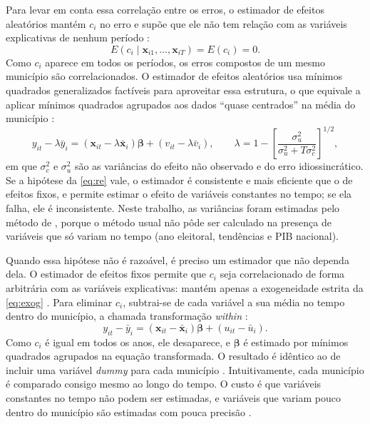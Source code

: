 Para levar em conta essa correlação entre os erros, o estimador de efeitos aleatórios mantém $c_i$ no erro e supõe que ele não tem relação com as variáveis explicativas de nenhum período \parencite[p.~257]{wooldridge2002}:
\begin{equation}\label{eq:re}
E(c_i \mid \mathbf{x}_{i1}, \dots, \mathbf{x}_{iT}) = E(c_i) = 0.
\end{equation}
Como $c_i$ aparece em todos os períodos, os erros compostos de um mesmo município são correlacionados. O estimador de efeitos aleatórios usa mínimos quadrados generalizados factíveis para aproveitar essa estrutura, o que equivale a aplicar mínimos quadrados agrupados aos dados ``quase centrados'' na média do município \parencite[p.~286--287]{wooldridge2002}:
\begin{equation}\label{eq:quasi}
y_{it} - \lambda \bar{y}_i = (\mathbf{x}_{it} - \lambda \bar{\mathbf{x}}_i)\boldsymbol{\beta} + (v_{it} - \lambda \bar{v}_i), \qquad
\lambda = 1 - \left[ \frac{\sigma_u^2}{\sigma_u^2 + T\sigma_c^2} \right]^{1/2},
\end{equation}
em que $\sigma_c^2$ e $\sigma_u^2$ são as variâncias do efeito não observado e do erro idiossincrático. Se a hipótese da \autoref{eq:re} vale, o estimador é consistente e mais eficiente que o de efeitos fixos, e permite estimar o efeito de variáveis constantes no tempo; se ela falha, ele é inconsistente. Neste trabalho, as variâncias foram estimadas pelo método de \textcite{wallace1969}, porque o método usual não pôde ser calculado na presença de variáveis que só variam no tempo (ano eleitoral, tendências e PIB nacional).

Quando essa hipótese não é razoável, é preciso um estimador que não dependa dela. O estimador de efeitos fixos permite que $c_i$ seja correlacionado de forma arbitrária com as variáveis explicativas: mantém apenas a exogeneidade estrita da \autoref{eq:exog} \parencite[p.~265--266]{wooldridge2002}. Para eliminar $c_i$, subtrai-se de cada variável a sua média no tempo dentro do município, a chamada transformação \textit{within} \parencite[p.~267]{wooldridge2002}:
\begin{equation}\label{eq:within}
y_{it} - \bar{y}_i = (\mathbf{x}_{it} - \bar{\mathbf{x}}_i)\boldsymbol{\beta} + (u_{it} - \bar{u}_i).
\end{equation}
Como $c_i$ é igual em todos os anos, ele desaparece, e $\boldsymbol{\beta}$ é estimado por mínimos quadrados agrupados na equação transformada. O resultado é idêntico ao de incluir uma variável \textit{dummy} para cada município \parencite[p.~272--273]{wooldridge2002}. Intuitivamente, cada município é comparado consigo mesmo ao longo do tempo. O custo é que variáveis constantes no tempo não podem ser estimadas, e variáveis que variam pouco dentro do município são estimadas com pouca precisão \parencite[p.~266, 286]{wooldridge2002}.

